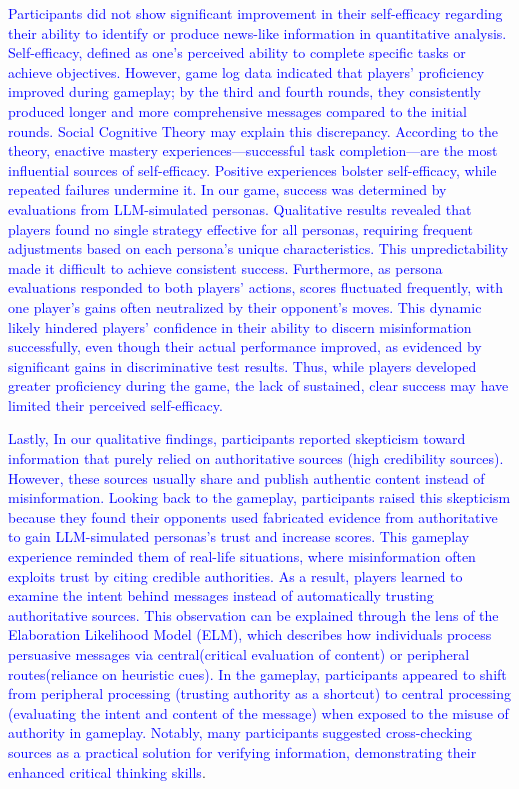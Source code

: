 \textcolor{blue}{Participants did not show significant improvement in their self-efficacy regarding their ability to identify or produce news-like information in quantitative analysis. Self-efficacy, defined as one’s perceived ability to complete specific tasks or achieve objectives\cite{bandura1988organisational}. However, game log data indicated that players' proficiency improved during gameplay; by the third and fourth rounds, they consistently produced longer and more comprehensive messages compared to the initial rounds. Social Cognitive Theory may explain this discrepancy. According to the theory, enactive mastery experiences—successful task completion—are the most influential sources of self-efficacy\cite{bandura1997self}. Positive experiences bolster self-efficacy, while repeated failures undermine it. In our game, success was determined by evaluations from LLM-simulated personas. Qualitative results revealed that players found no single strategy effective for all personas, requiring frequent adjustments based on each persona’s unique characteristics. This unpredictability made it difficult to achieve consistent success. Furthermore, as persona evaluations responded to both players’ actions, scores fluctuated frequently, with one player’s gains often neutralized by their opponent’s moves. This dynamic likely hindered players’ confidence in their ability to discern misinformation successfully, even though their actual performance improved, as evidenced by significant gains in discriminative test results. Thus, while players developed greater proficiency during the game, the lack of sustained, clear success may have limited their perceived self-efficacy.
}

\textcolor{blue}{Lastly, In our qualitative findings, participants reported skepticism toward information that purely relied on authoritative sources (high credibility sources). However, these sources usually share and publish authentic content instead of misinformation. Looking back to the gameplay, participants raised this skepticism because they found their opponents used fabricated evidence from authoritative to gain LLM-simulated personas’s trust and increase scores. This gameplay experience reminded them of real-life situations, where misinformation often exploits trust by citing credible authorities. As a result, players learned to examine the intent behind messages instead of automatically trusting authoritative sources. This observation can be explained through the lens of the Elaboration Likelihood Model (ELM)\cite{petty1984source}, which describes how individuals process persuasive messages via central(critical evaluation of content) or peripheral routes(reliance on heuristic cues). In the gameplay, participants appeared to shift from peripheral processing (trusting authority as a shortcut) to central processing (evaluating the intent and content of the message) when exposed to the misuse of authority in gameplay. Notably, many participants suggested cross-checking sources as a practical solution for verifying information, demonstrating their enhanced critical thinking skills}.

